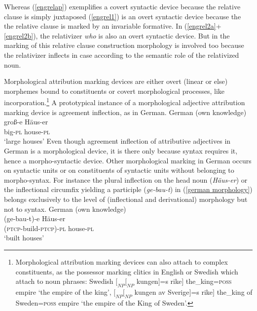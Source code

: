 Whereas (\ref{engrelap}) exemplifies a covert syntactic device because the relative clause is simply juxtaposed (\ref{engrel1}) is an overt syntactic device because the the relative clause is marked by an invariable formative. In (\ref{engrel2a}+\ref{engrel2b}), the relativizer \textit{who} is also an overt syntactic device. But in the marking of this relative clause construction morphology is involved too because the relativizer inflects in case according to the semantic role of the relativized noun.

Morphological attribution marking devices are either overt (linear or else) morphemes bound to constituents or covert morphological processes, like incorporation.\footnote{Morphological attribution marking devices can also attach to complex constituents, as the possessor marking clitics in English or Swedish which attach to noun phrases: Swedish $[_{NP} [_{NP}$ kungen$]$=s rike$]$ the\_king=\textsc{poss} empire ‘the empire of the king’, $[_{NP} [_{NP}$ kungen av Sverige$]$=s rike$]$ the\_king of Sweden=\textsc{poss} empire ‘the empire of the King of Sweden’.} A prototypical instance of a morphological adjective attribution marking device is agreement inflection, as in German.
\ea
{\rm German (own knowledge)}\\
\gll	groß-e Häus-er\\
	big-\textsc{pl} house-\textsc{pl}\\
\glt	‘large houses’
\z
Even though agreement inflection of attributive adjectives in German is a morphological device, it is there only because syntax requires it,  hence a morpho-syntactic device. Other morphological marking in German occurs on syntactic units or on constituents of syntactic units without belonging to morpho-syntax. For instance the plural inflection on the head noun (\textit{Häus-er}) or the inflectional circumfix yielding a participle (\textit{ge-bau-t}) in (\ref{german morphology}) belongs exclusively to the level of (inflectional and derivational) morphology but not to syntax.
\ea\label{german morphology}
{\rm German (own knowledge)}\\
\gll	(ge-bau-t)-e Häus-er\\
	(\textsc{ptcp}-build-\textsc{ptcp})-\textsc{pl} house-\textsc{pl}\\
\glt	‘built houses’
\z
